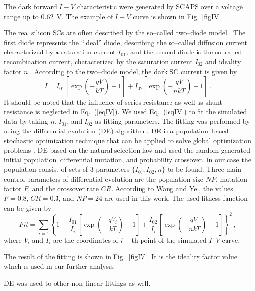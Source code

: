 \documentclass [sort&compress] {elsarticle}
\begin{document}
The dark forward $I-V$ characteristic were generated by SCAPS over a voltage range up to $0.62$~V.
The example of $I-V$ curve is shown in Fig.~\ref{figIV}.

The real silicon SCs are often described by the so--called two--diode model \cite{Breitenstein2013}.
The first diode represents the ``ideal'' diode, describing the so--called diffusion current characterized by a saturation current $I_{01}$,
and the second diode is the so--called recombination current, characterized by the saturation current $I_{02}$ and ideality factor $n$ \cite{Breitenstein2013}.
According to the two--diode model, the dark SC current is given by
\begin{equation}
\label{eqIV}
    I=I_{01}\left[\exp\left(-\frac{qV}{kT}\right)-1\right]+ I_{02}\left[\exp\left(-\frac{qV}{nkT}\right)-1\right]\,.
\end{equation}
It should be noted that the influence of series resistance as well as shunt resistance is neglected in Eq.~(\ref{eqIV}).
We used Eq.~(\ref{eqIV}) to fit the simulated data by taking $n$, $I_{01}$, and $I_{02}$ as fitting parameters.
The fitting was performed by using the differential evolution (DE) algorithm \cite{DE:Sun,DEWang}.
DE is a population--based stochastic optimization technique that can be applied to solve global optimization problems \cite{TONG2018130}.
DE based on the natural selection law and used the random generated initial population, differential mutation, and probability crossover.
In our case the population consist of sets of 3 parameters $\{I_{01},I_{02},n\}$ to be found.
Three main control parameters of differential evolution are the population size $NP$, mutation factor $F$, and the crossover rate $CR$.
According to Wang and Ye \cite{DEWang}, the values $F=0.8$, $CR=0.3$, and $NP=24$ are used in this work.
The used fitness function can be given by
\begin{equation}
\label{eqIVfit}
   Fit=\sum_{i=1}\left\{1-\frac{I_{01}}{I_i}\left[\exp\left(-\frac{qV_i}{kT}\right)-1\right]+
    \frac{I_{02}}{I_i}\left[\exp\left(-\frac{qV_i}{nkT}\right)-1\right]\right\}^2\,,
\end{equation}
where
$V_i$ and $I_i$ are the coordinates of $i-$th point of the simulated $I$--$V$ curve.

The result of the fitting is shown in Fig.~\ref{figIV}.
It is the ideality factor value which is used in our further analysis.

DE was used to other non--linear fittings as well.
\end{document}
